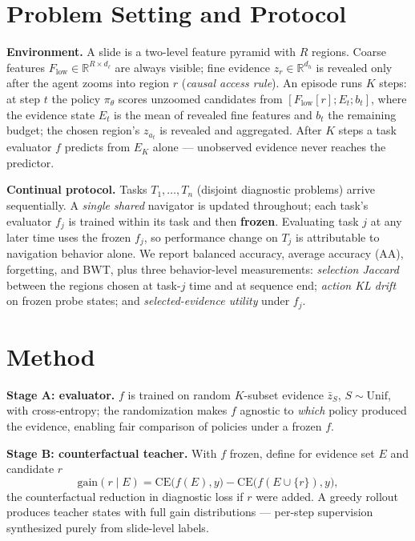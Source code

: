 \documentclass{article}
\begin{document}
\section{Problem Setting and Protocol}
\label{sec:setting}

\textbf{Environment.} A slide is a two-level feature pyramid with $R$ regions.
Coarse features $F_{\mathrm{low}} \in \mathbb{R}^{R \times d_\ell}$ are always
visible; fine evidence $z_r \in \mathbb{R}^{d_h}$ is revealed only after the
agent zooms into region $r$ (\emph{causal access rule}). An episode runs $K$
steps: at step $t$ the policy $\pi_\theta$ scores unzoomed candidates from
$[F_{\mathrm{low}}[r]; E_t; b_t]$, where the evidence state
$E_t$ is the mean of revealed fine features and $b_t$ the remaining budget;
the chosen region's $z_{a_t}$ is revealed and aggregated. After $K$ steps a
task evaluator $f$ predicts from $E_K$ alone --- unobserved evidence never
reaches the predictor.

\textbf{Continual protocol.} Tasks $T_1,\dots,T_n$ (disjoint diagnostic
problems) arrive sequentially. A \emph{single shared} navigator is updated
throughout; each task's evaluator $f_j$ is trained within its task and then
\textbf{frozen}. Evaluating task $j$ at any later time uses the frozen $f_j$,
so performance change on $T_j$ is attributable to navigation behavior alone.
We report balanced accuracy, average accuracy (AA), forgetting, and BWT,
plus three behavior-level measurements: \emph{selection Jaccard} between the
regions chosen at task-$j$ time and at sequence end; \emph{action KL drift}
on frozen probe states; and \emph{selected-evidence utility} under $f_j$.

\section{Method}
\label{sec:method}

\textbf{Stage A: evaluator.} $f$ is trained on random $K$-subset evidence
$\bar z_S$, $S\!\sim\!\text{Unif}$, with cross-entropy; the randomization
makes $f$ agnostic to \emph{which} policy produced the evidence, enabling fair
comparison of policies under a frozen $f$.

\textbf{Stage B: counterfactual teacher.} With $f$ frozen, define for
evidence set $E$ and candidate $r$
\begin{equation}
\mathrm{gain}(r \mid E) = \mathrm{CE}\!\big(f(E), y\big) -
\mathrm{CE}\!\big(f(E \cup \{r\}), y\big),
\label{eq:gain}
\end{equation}
the counterfactual reduction in diagnostic loss if $r$ were added. A greedy
rollout produces teacher states with full gain distributions --- per-step
supervision synthesized purely from slide-level labels.
\end{document}
